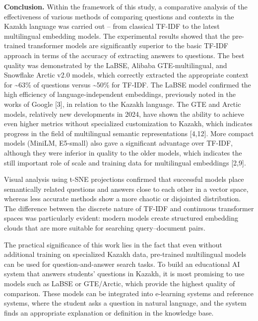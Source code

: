 \begin{multicols}{2}
{\bfseries Conclusion.} Within the framework of this study, a comparative
analysis of the effectiveness of various methods of comparing questions
and contexts in the Kazakh language was carried out -- from classical
TF-IDF to the latest multilingual embedding models. The experimental
results showed that the pre-trained transformer models are significantly
superior to the basic TF-IDF approach in terms of the accuracy of
extracting answers to questions. The best quality was demonstrated by
the LaBSE, Alibaba GTE-multilingual, and Snowflake Arctic v2.0 models,
which correctly extracted the appropriate context for
\textasciitilde63\% of questions versus \textasciitilde50\% for TF-IDF.
The LaBSE model confirmed the high efficiency of language-independent
embeddings, previously noted in the works of Google {[}3{]}, in relation
to the Kazakh language. The GTE and Arctic models, relatively new
developments in 2024, have shown the ability to achieve even higher
metrics without specialized customization to Kazakh, which indicates
progress in the field of multilingual semantic representations
{[}4,12{]}. More compact models (MiniLM, E5-small) also gave a
significant advantage over TF-IDF, although they were inferior in
quality to the older models, which indicates the still important role of
scale and training data for multilingual embeddings {[}2,9{]}.

Visual analysis using t-SNE projections confirmed that successful models
place semantically related questions and answers close to each other in
a vector space, whereas less accurate methods show a more chaotic or
disjointed distribution. The difference between the discrete nature of
TF-IDF and continuous transformer spaces was particularly evident:
modern models create structured embedding clouds that are more suitable
for searching query--document pairs.

The practical significance of this work lies in the fact that even
without additional training on specialized Kazakh data, pre-trained
multilingual models can be used for question-and-answer search tasks. To
build an educational AI system that answers students'{}
questions in Kazakh, it is most promising to use models such as LaBSE or
GTE/Arctic, which provide the highest quality of comparison. These
models can be integrated into e-learning systems and reference systems,
where the student asks a question in natural language, and the system
finds an appropriate explanation or definition in the knowledge base.


\end{multicols}
